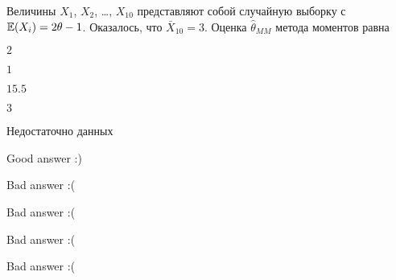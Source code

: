 
\begin{question}
Величины \(X_1\), \(X_2\), \ldots, \(X_{10}\) представляют собой
случайную выборку с \(\operatorname{\mathbb{E}}(X_i) = 2\theta - 1\). Оказалось, что
\(\bar X_{10}=3\). Оценка \(\hat\theta_{MM}\) метода моментов равна
\begin{answerlist}
  \item \(2\)
  \item \(1\)
  \item \(15.5\)
  \item \(3\)
  \item Недостаточно данных
\end{answerlist}
\end{question}

\begin{solution}
\begin{answerlist}
  \item Good answer :)
  \item Bad answer :(
  \item Bad answer :(
  \item Bad answer :(
  \item Bad answer :(
\end{answerlist}
\end{solution}

